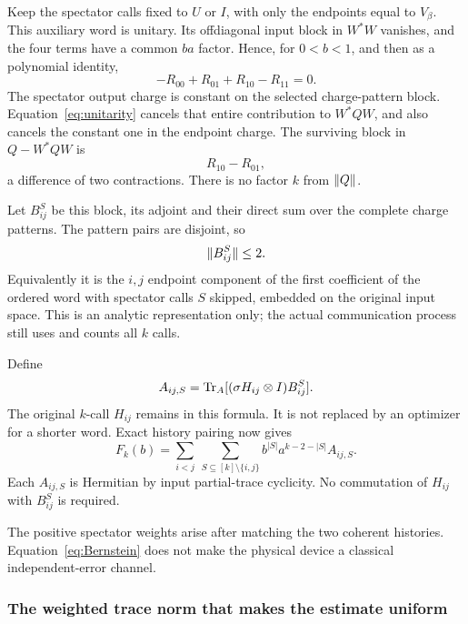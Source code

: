 Keep the spectator calls fixed to \(U\) or \(I\), with only the endpoints
equal to \(V_\beta\). This auxiliary word is unitary. Its offdiagonal
input block in \(W^*W\) vanishes, and the four terms have a common \(ba\)
factor. Hence, for \(0<b<1\), and then as a polynomial identity,
\begin{equation}\label{eq:unitarity}
 -R_{00}+R_{01}+R_{10}-R_{11}=0.
\end{equation}
The spectator output charge is constant on the selected charge-pattern
block. Equation~\eqref{eq:unitarity} cancels that entire contribution to
\(W^*QW\), and also cancels the constant one in the endpoint charge.
The surviving block in \(Q-W^*QW\) is
\[
 R_{10}-R_{01},
\]
a difference of two contractions. There is no factor \(k\) from
\(\lVert Q\rVert\).

Let \(B_{ij}^S\) be this block, its adjoint and their direct sum over
the complete charge patterns. The pattern pairs are disjoint, so
\begin{equation}\label{eq:Bnorm}
 \lVert B_{ij}^S\rVert\le2.
\end{equation}
Equivalently it is the \(i,j\) endpoint component of the first coefficient
of the ordered word with spectator calls \(S\) skipped, embedded on the
original input space. This is an analytic representation only; the actual
communication process still uses and counts all \(k\) calls.

Define
\begin{equation}\label{eq:A}
 A_{ij,S}=\operatorname{Tr}_A[(\sigma H_{ij}\otimes I)B_{ij}^S].
\end{equation}
The original \(k\)-call \(H_{ij}\) remains in this formula. It is not replaced
by an optimizer for a shorter word. Exact history pairing now gives
\begin{equation}\label{eq:Bernstein}
 F_k(b)=\sum_{i<j}\ \sum_{S\subseteq[k]\setminus\{i,j\}}
          b^{|S|}a^{k-2-|S|}A_{ij,S}.
\end{equation}
Each \(A_{ij,S}\) is Hermitian by input partial-trace cyclicity. No
commutation of \(H_{ij}\) with \(B_{ij}^S\) is required.

The positive spectator weights arise after matching the two coherent
histories. Equation~\eqref{eq:Bernstein} does not make the physical
device a classical independent-error channel.

\subsubsection{The weighted trace norm that makes the estimate uniform}

